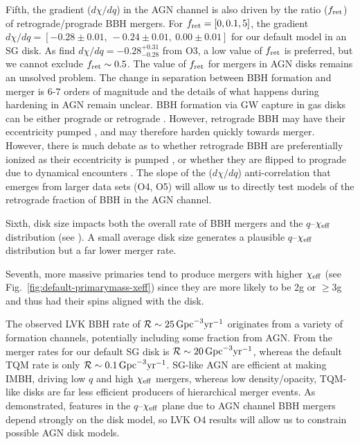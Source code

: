 Fifth, the gradient ($d\chi/dq$) in the AGN channel is also driven by the ratio ($f_{\rm ret}$) of retrograde/prograde BBH mergers.
For $f_{\rm ret}=[0,0.1,5]$, the gradient $d\chi/dq=[-0.28\pm0.01,\ -0.24\pm0.01,\ 0.00\pm0.01]$ for our default model in an SG disk.
As \citet{Callister+21} find $d\chi/dq = -0.28^{+0.31}_{-0.28}$ from O3, a low value of $f_{\rm ret}$ is preferred, but we cannot exclude $f_{\rm ret} \sim 0.5$.
The value of $f_{\rm ret}$ for mergers in AGN disks remains an unsolved problem.
The change in separation between BBH formation and merger is 6-7 orders of magnitude and the details of what happens during hardening in AGN remain unclear.
BBH formation via GW capture in gas disks can be either prograde or retrograde \citep[e.g.][]{DeLaurentiis+23,Whitehead+24,QianLiLai24}.
However, retrograde BBH may have their eccentricity pumped \citep{Li+22-bbh-evo,Calcino+23}, and may therefore harden quickly towards merger.
However, there is much debate as to whether retrograde BBH are preferentially ionized as their eccentricity is pumped \citep{Wang+21}, or whether they are flipped to prograde due to dynamical encounters \citep{Samsing+22,McKernanFord24}.
The slope of the ($d\chi/dq$) anti-correlation that emerges from larger data sets (O4, O5) will allow us to directly test models of the retrograde fraction of BBH in the AGN channel.

Sixth, disk size impacts both the overall rate of BBH mergers and the $q$--$\chi_{\rm eff}$ distribution (see ).
A small average disk size generates a plausible $q$--$\chi_{\rm eff}$ distribution but a far lower merger rate.

Seventh, more massive primaries tend to produce mergers with higher $\chi_{\rm eff}$ (see Fig.~\ref{fig:default-primarymass-xeff}) since they are more likely to be 2g or $\geq$3g and thus had their spins aligned with the disk.

The observed LVK BBH rate of $\mathcal{R} \sim 25\,{\rm Gpc}^{-3} {\rm yr}^{-1}$ \citep{Abbott+23-O3b} originates from a variety of formation channels, potentially including some fraction from AGN.
From \citet{McKernan+25-mcfactsI} the merger rates for our default SG disk is $\mathcal{R} \sim 20\,{\rm Gpc}^{-3} \rm{yr}^{-1}$, whereas the default TQM rate is only $\mathcal{R} \sim 0.1\,{\rm Gpc}^{-3} \rm{yr}^{-1}$.
SG-like AGN are efficient at making IMBH, driving low $q$ and high $\chi_{\rm eff}$ mergers, whereas low density/opacity, TQM-like disks are far less efficient producers of hierarchical merger events.
As demonstrated, features in the $q$--$\chi_{\rm eff}$ plane due to AGN channel BBH mergers depend strongly on the disk model, so LVK O4 results will allow us to constrain possible AGN disk models.

